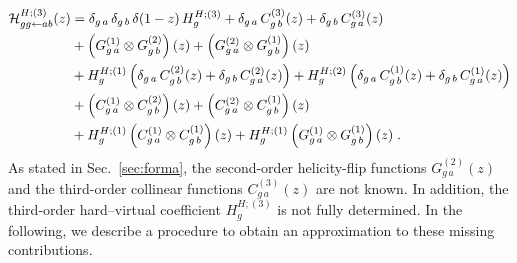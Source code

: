 \documentclass[12pt]{article}
\def\nn{\nonumber}
\def\ito{\leftarrow}
\begin{document}
\begin{align}
\label{H3}
{\cal H}^{H;(3)}_{gg\ito ab}(z)&=
\delta_{g\,a} \,\delta_{g\,b} \,\delta(1-z)\,H^{H;(3)}_g
+\delta_{g\,a} \,C^{(3)}_{g\,b}(z)
+\delta_{g\,b} \,C^{(3)}_{g\,a}(z)\nn\\
&
+\left(G^{(1)}_{g\,a}\otimes G^{(2)}_{g\,b}\right)(z)
+\left(G^{(2)}_{g\,a}\otimes G^{(1)}_{g\,b}\right)(z)\nn\\
&
+H^{H;(1)}_g\left(\delta_{g\,a} \,C^{(2)}_{g\,b}(z)
+\delta_{g\,b} \,C^{(2)}_{g\,a}(z)\right)
+H^{H;(2)}_g\left(\delta_{g\,a} \,C^{(1)}_{g\,b}(z)
+\delta_{g\,b} \,C^{(1)}_{g\,a}(z)\right)\nn\\
&
+\left(C^{(1)}_{g\,a}\otimes C^{(2)}_{g\,b}\right)(z)+
\left(C^{(2)}_{g\,a}\otimes C^{(1)}_{g\,b}\right)(z)\nn\\
&
+ H^{H;(1)}_g  \left(C^{(1)}_{g\,a}\otimes C^{(1)}_{g\,b}\right)(z) 
 +    H^{H;(1)}_g  \left(G^{(1)}_{g\,a}\otimes G^{(1)}_{g\,b}\right)(z) \;.         
\end{align}
As stated in Sec.~\ref{sec:forma}, the second-order helicity-flip functions $G^{(2)}_{g\,a}(z)$ and the third-order collinear functions $C^{(3)}_{g\,a}(z)$ are not known. In addition, the third-order hard--virtual coefficient $H^{H;(3)}_g$ is not fully determined. In the following, we describe a procedure to obtain an approximation to these missing contributions. 
\end{document}
